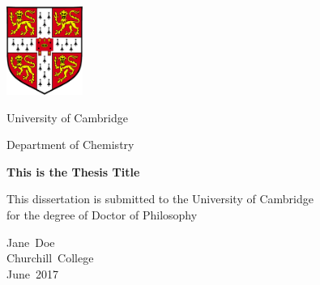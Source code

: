 \begin{titlepage}

\centerline{\includegraphics[width=25mm]{Images/UnivShield.png}}
\centerline{\sc University of Cambridge}
\centerline{\sc Department of Chemistry}

\vspace{4cm}

\centerline{\textbf{\huge This is the Thesis Title}}

\vspace{3cm}

\begin{center}
This dissertation is submitted to the University of Cambridge \\
for the degree of Doctor of Philosophy
\end{center}

\vspace{3cm}

\begin{center}
\begin{Large}
Jane~Doe\\
Churchill~College \\
June~2017 \\
\end{Large}
\end{center}

\end{titlepage}
